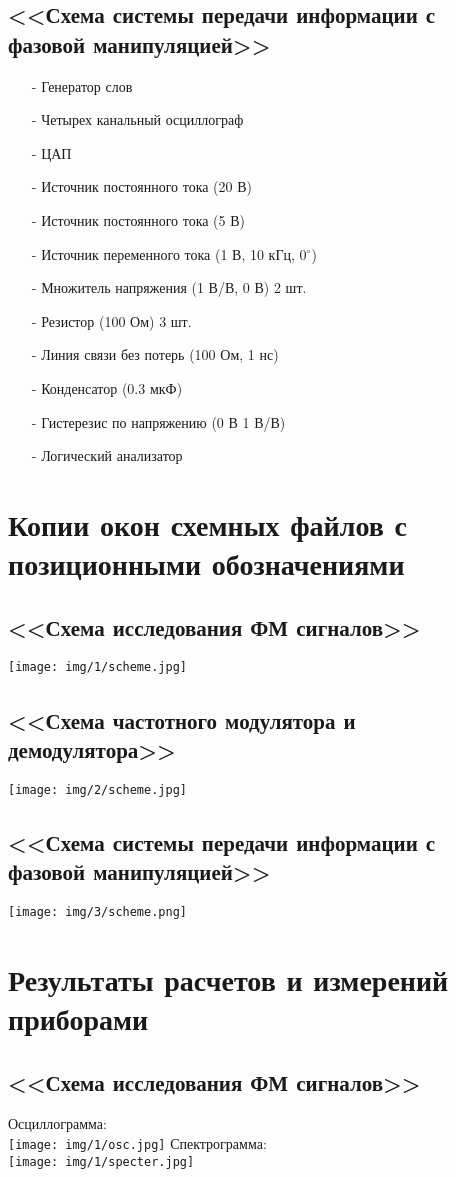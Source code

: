 \documentclass[11pt]{article}
\begin{document}
\subsection{<<Схема системы передачи информации с фазовой манипуляцией>>}
\begin{itemize}
    \item[-] Генератор слов 
    \item[-] Четырех канальный осциллограф
    \item[-] ЦАП
    \item[-] Источник постоянного тока (20 В)
    \item[-] Источник постоянного тока (5 В)
    \item[-] Источник переменного тока (1 В, 10 кГц, 0$^{\circ}$)
    \item[-] Множитель напряжения (1 В/В, 0 В) 2 шт.
    \item[-] Резистор (100 Ом) 3 шт.
    \item[-] Линия связи без потерь (100 Ом, 1 нс)
    \item[-] Конденсатор (0.3 мкФ)
    \item[-] Гистерезис по напряжению (0 В 1 В/В)
    \item[-] Логический анализатор 
\end{itemize}
\section{Копии окон схемных файлов с позиционными
обозначениями}
\subsection{<<Схема исследования ФМ сигналов>>}
\texttt{[image: img/1/scheme.jpg]} 
\subsection{<<Схема частотного модулятора и демодулятора>>}
\texttt{[image: img/2/scheme.jpg]} 
\subsection{<<Схема системы передачи информации с фазовой манипуляцией>>}
\texttt{[image: img/3/scheme.png]} 
\section{Результаты расчетов и измерений приборами}
\subsection{<<Схема исследования ФМ сигналов>>}
Осциллограмма:\\
\texttt{[image: img/1/osc.jpg]} 
Спектрограмма:\\
\texttt{[image: img/1/specter.jpg]}
\end{document}

